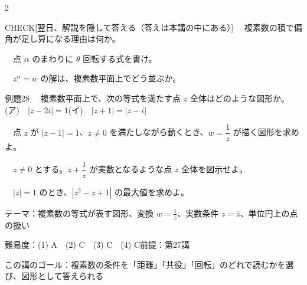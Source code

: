 \documentclass[paper=b5j, fontsize=8pt, fleqn, twoside]{jlreq}
\begin{document}
\begin{multicols*}{2}
  \begin{ptbs}{CHECK}[翌日、解説を隠して答える（答えは本講の中にある）]
    　複素数の積で偏角が足し算になる理由は何か。\par
    　点 $\alpha$ のまわりに $\theta$ 回転する式を書け。\par
    　$z^n=w$ の解は、複素数平面上でどう並ぶか。
  \end{ptbs}

  \notefill
  \columnbreak
  \notefill
\end{multicols*}

\begin{ascolorbox4A}[出典：オリジナル]{例題28}
  　複素数平面上で、次の等式を満たす点 $z$ 全体はどのような図形か。\quad(ア)　$|z-2i|=1$\quad(イ)　$|z+1|=|z-i|$\par
  　点 $z$ が $|z-1|=1$、$z\neq0$ を満たしながら動くとき、$w=\dfrac1z$ が描く図形を求めよ。\par
  　$z\neq0$ とする。$z+\dfrac1z$ が実数となるような点 $z$ 全体を図示せよ。\par
  　$|z|=1$ のとき、$|z^2-z+1|$ の最大値を求めよ。
\end{ascolorbox4A}

\begin{Data}
  テーマ：複素数の等式が表す図形、変換 $w=\frac1z$、実数条件 $z=\overline z$、単位円上の点の扱い\par
  難易度：(1) A　(2) C　(3) C　(4) C\quad 前提：第27講\par
  この講のゴール：複素数の条件を「距離」「共役」「回転」のどれで読むかを選び、図形として答えられる
\end{Data}
\end{document}
